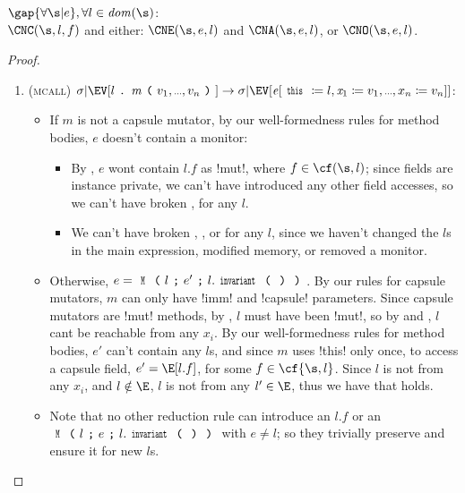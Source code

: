 \begin{theorem}\rm
$\gap{\forall \s|e},\forall l \in \mathit{dom}(\s)$:\\
\indent $\CNC(\s, l, f)$ and either:
\qindent $\CNE(\s, e, l)$ and $\CNA(\s, e, l)$, or
\qindent $\CNO(\s, e, l)$.
\end{theorem}
\begin{proof}
\clearpage
\SSI\begin{enumerate}
\item (\textsc{mcall}) $\sigma|\EV[l\singleDot\m\oR v_1,\ldots,v_n\cR]\rightarrow \sigma|\EV[\e[\Kw{this}\coloneqq l,\x_1\coloneqq v_1,\ldots,x_n\coloneqq v_n]]$:
\begin{itemize}
\item If $m$ is not a capsule mutator, by our well-formedness rules for method bodies, $e$ doesn't contain a monitor:
\begin{itemize}
		\item By , $e$ wont contain $l.f$ as \Q!mut!, where $f \in \cf(\s, l)$; since fields are instance private, we can't have introduced any other field accesses, so we can't have broken \CNA, for any $l$.
		\item We can't have broken \CNC, \CNE, or \CNO for any $l$, since we haven't changed the $l$s in the main expression, modified memory, or removed a monitor.
\end{itemize}
\item Otherwise, $e = \M{l}{e'}{l.\invariant}$. By our rules for capsule mutators, $m$ can only have \Q!imm! and \Q!capsule! parameters. Since capsule mutators are \Q!mut! methods, by , $l$ must have been \Q!mut!, so by  and , $l$ cant be reachable from any $x_i$. By our well-formedness rules for method bodies, $e'$ can't contain any $l$s, and since $m$ uses \Q!this! only once, to access a capsule field, $e' = \E[l.f]$, for some $f \in \cf{\s, l}$. Since $l$ is not \reach from any $x_i$, and $l \notin \E$, $l$ is not \reach from any $l' \in \E$, thus we have that \CNO holds.
\item Note that no other reduction rule can introduce an $l.f$ or an $\M{l}{e}{l.\invariant}$ with $e \neq l$; so they trivially preserve \CNA and ensure it for new $l$s.
\end{itemize}


\end{enumerate}
\end{proof}

